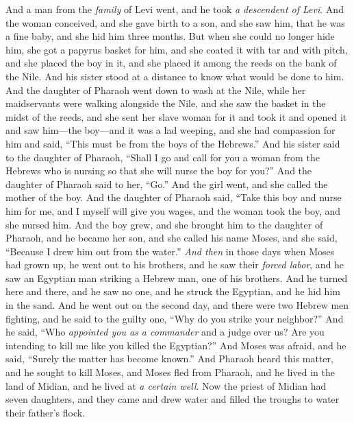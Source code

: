\begin{biblechapter} %
 And a man from the \textit{family} of Levi went, and he took \textit{a descendent of Levi}.
\verse And the woman conceived, and she gave birth to a son, and she saw him, that he was a fine baby, and she hid him three months.
\verse But when she could no longer hide him, she got a papyrus basket for him, and she coated it with tar and with pitch, and she placed the boy in it, and she placed it among the reeds on the bank of the Nile.
\verse And his sister stood at a distance to know what would be done to him.
\verse And the daughter of Pharaoh went down to wash at the Nile, while her maidservants were walking alongside the Nile, and she saw the basket in the midst of the reeds, and she sent her slave woman for it and took it
\verse and opened it and saw him—the boy—and it was a lad weeping, and she had compassion for him and said, “This must be from the boys of the Hebrews.”
\verse And his sister said to the daughter of Pharaoh, “Shall I go and call for you a woman from the Hebrews who is nursing so that she will nurse the boy for you?”
\verse And the daughter of Pharaoh said to her, “Go.” And the girl went, and she called the mother of the boy.
\verse And the daughter of Pharaoh said, “Take this boy and nurse him for me, and I myself will give you wages, and the woman took the boy, and she nursed him.
\verse And the boy grew, and she brought him to the daughter of Pharaoh, and he became her son, and she called his name Moses, and she said, “Because I drew him out from the water.”
\verse \textit{And then} in those days when Moses had grown up, he went out to his brothers, and he saw their \textit{forced labor}, and he saw an Egyptian man striking a Hebrew man, one of his brothers.
\verse And he turned here and there, and he saw no one, and he struck the Egyptian, and he hid him in the sand.
\verse And he went out on the second day, and there were two Hebrew men fighting, and he said to the guilty one, “Why do you strike your neighbor?”
\verse And he said, “Who \textit{appointed you as a commander} and a judge over us? Are you intending to kill me like you killed the Egyptian?” And Moses was afraid, and he said, “Surely the matter has become known.”
\verse And Pharaoh heard this matter, and he sought to kill Moses, and Moses fled from Pharaoh, and he lived in the land of Midian, and he lived at \textit{a certain well}.
\verse Now the priest of Midian had seven daughters, and they came and drew water and filled the troughs to water their father’s flock.

\end{biblechapter}
